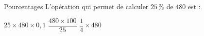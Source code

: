 \documentclass[12pt]{beamer}
\begin{document}
\begin{frame}[plain]
\end{frame}

\begin{DiapoAutomatisme}{Pourcentages}
L'opération qui permet de calculer $25\,\%$ de $480$ est :

\smallskip

  {$25 \times 480 \times 0{,}1$}
  {$\dfrac{480 \times 100}{25}$}
  {$\dfrac{1}{4} \times 480$}
\end{DiapoAutomatisme}

\end{document}

